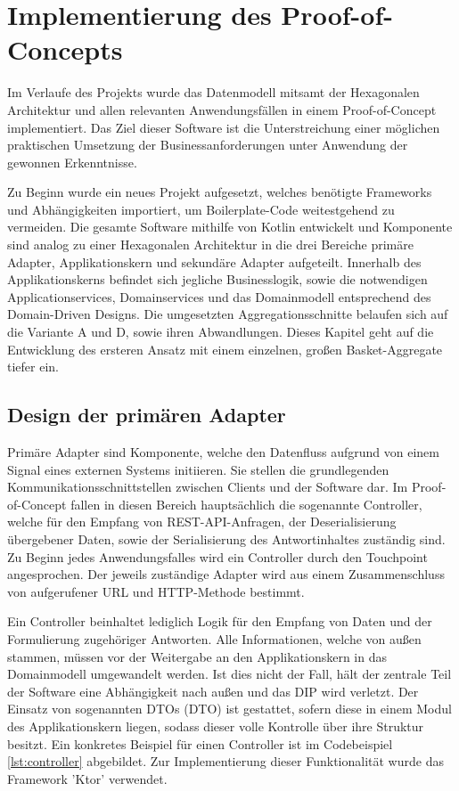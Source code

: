 \chapter{Implementierung des Proof-of-Concepts}

Im Verlaufe des Projekts wurde das Datenmodell mitsamt der Hexagonalen Architektur und allen relevanten Anwendungsfällen in einem Proof-of-Concept implementiert. Das Ziel dieser Software ist die Unterstreichung einer möglichen praktischen Umsetzung der Businessanforderungen unter Anwendung der gewonnen Erkenntnisse. 

Zu Beginn wurde ein neues Projekt aufgesetzt, welches benötigte Frameworks und Abhängigkeiten importiert, um \gls{Boilerplate}-Code weitestgehend zu vermeiden. Die gesamte Software  mithilfe von Kotlin entwickelt und Komponente sind analog zu einer Hexagonalen Architektur in die drei Bereiche primäre Adapter, Applikationskern und sekundäre Adapter aufgeteilt. Innerhalb des Applikationskerns befindet sich jegliche Businesslogik, sowie die notwendigen Applicationservices, Domainservices und das Domainmodell entsprechend des Domain-Driven Designs. Die umgesetzten Aggregationsschnitte belaufen sich auf die Variante A und D, sowie ihren Abwandlungen. Dieses Kapitel geht auf die Entwicklung des ersteren Ansatz mit einem einzelnen, großen Basket-Aggregate tiefer ein.


\section{Design der primären Adapter}

Primäre Adapter sind Komponente, welche den Datenfluss aufgrund von einem Signal eines externen Systems initiieren. Sie stellen die grundlegenden Kommunikationsschnittstellen zwischen Clients und der Software dar. Im Proof-of-Concept fallen in diesen Bereich hauptsächlich die sogenannte Controller, welche für den Empfang von REST-API-Anfragen, der Deserialisierung übergebener Daten, sowie der Serialisierung des Antwortinhaltes zuständig sind. Zu Beginn jedes Anwendungsfalles wird ein Controller durch den Touchpoint angesprochen. Der jeweils zuständige Adapter wird aus einem Zusammenschluss von aufgerufener URL und HTTP-Methode bestimmt. 

Ein Controller beinhaltet lediglich Logik für den Empfang von Daten und der Formulierung zugehöriger Antworten. Alle Informationen, welche von außen stammen, müssen vor der Weitergabe an den Applikationskern in das Domainmodell umgewandelt werden. Ist dies nicht der Fall, hält der zentrale Teil der Software eine Abhängigkeit nach außen und das \acrlong{DIP} wird verletzt. Der Einsatz von sogenannten \acrlong{DTO}s (\acrshort{DTO}) ist gestattet, sofern diese in einem Modul des Applikationskern liegen, sodass dieser volle Kontrolle über ihre Struktur besitzt. Ein konkretes Beispiel für einen Controller ist im Codebeispiel \ref{lst:controller} abgebildet. Zur Implementierung dieser Funktionalität wurde das Framework 'Ktor' verwendet.

